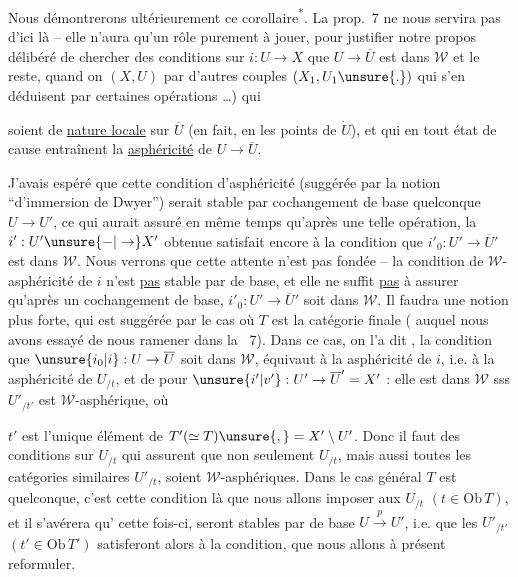 Nous démontrerons ultérieurement ce
corollaire\textsuperscript{*}.
La prop.~7 ne nous servira pas
d'ici là -- elle n'aura qu'un rôle
purement  à jouer, pour justifier
notre propos délibéré de chercher des
conditions sur $i:U\to X$ 
que $U\to\overline U$ est dans $\mathcal W$ et le reste, 
quand on  $(X,U)$ par d'autres
couples $(X_1,U_1\unsure{.})$ qui s'en déduisent par
certaines opérations \ldots) qui


soient de \uline{nature locale} sur $\overline U$ (en fait, en les
points de $\dot U$), et  qui
 en tout état de cause entraînent
la \uline{asphéricité} de $U\to\overline U$.

J'avais espéré que cette condition d'asphéricité (suggérée par la notion ``d'immersion
de Dwyer'') serait stable par cochangement
de base quelconque $U\to U'$, ce qui aurait
assuré en même temps qu'après une telle
opération, la  $i':U'\unsure{-|\to}X'$ obtenue satisfait
encore à la condition que $i'_0:U'\to\overline U'$ est
dans $\mathcal W$. Nous verrons que cette attente n'est
pas fondée -- la condition de $\mathcal W$-asphéricité de $i$
n'est \uline{pas} stable par  de base, et elle
ne suffit \uline{pas}  à assurer qu'après un 
cochangement de base, $i'_0:U'\to\overline U'$ soit dans $\mathcal W$.
Il faudra une notion plus forte, qui est
suggérée par le cas où $T$ est la catégorie finale
( auquel nous avons essayé de nous ramener dans la ~7). Dans ce cas, on l'a dit ,
la condition que $\unsure{i_0|i}:U\to\overline U$ soit dans $\mathcal W$, équivaut
à la asphéricité de $i$, i.e. à la asphéricité de
$U_{/t}$, et de  pour $\unsure{i'|v'}:U'\to\overline U'=X'$ : elle
est dans $\mathcal W$ sss $U'_{/t'}$ est $\mathcal W$-asphérique, où


$t'$ est l'unique élément de $T'(\simeq T)\unsure{,}=X'\setminus U'$. Donc
il faut des conditions sur $U_{/t}$   qui
assurent que non seulement $U_{/t}$, mais aussi
toutes les catégories similaires $U'_{/t}$, soient
$\mathcal W$-asphériques. Dans le cas général 
$T$ est quelconque, c'est cette condition là que
nous allons imposer aux $U_{/t}$ $(t\in\mathrm{Ob}\,T)$, et il
s'avérera qu' cette fois-ci,  seront stables
par   de base $U\xrightarrow{p}U'$, i.e. que les
$U'_{/t'}$ $(t'\in\mathrm{Ob}\,T')$ satisferont alors à la  condition,
 que nous allons à présent reformuler.

